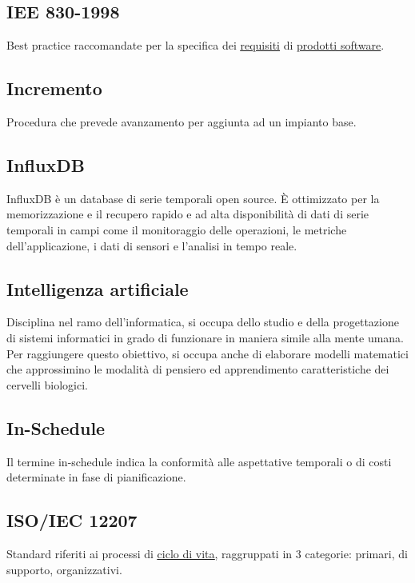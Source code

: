 	\newpage


	\subsection{IEE 830-1998}
	\label{sec:iee830}
	Best practice raccomandate per la specifica dei \underline{\hyperref[sec:requisito]{requisiti}} di \underline{\hyperref[sec:prodottosoftware]{prodotti software}}.


	\subsection{Incremento}
	\label{sec:incremento}
	Procedura che prevede avanzamento per aggiunta ad un impianto base.


	\subsection{InfluxDB}
	\label{sec:influxdb}
	InfluxDB è un database di serie temporali open source. È ottimizzato per la memorizzazione e il recupero rapido e ad alta disponibilità di dati di serie temporali in campi come il monitoraggio delle operazioni, le metriche dell'applicazione, i dati di sensori e l'analisi in tempo reale.


	\subsection{Intelligenza artificiale}
	\label{sec:ia}
	Disciplina nel ramo dell'informatica, si occupa dello studio e della progettazione di sistemi informatici in grado di funzionare in maniera simile alla mente umana. Per raggiungere questo obiettivo, si occupa anche di elaborare modelli matematici che approssimino le modalità di pensiero ed apprendimento caratteristiche dei cervelli biologici.


	\subsection{In-Schedule}
	\label{sec:inschedule}
	Il termine in-schedule indica la conformità alle aspettative temporali o di costi determinate in fase di pianificazione.


	\subsection{ISO/IEC 12207}
	\label{sec:iso12207}
	Standard riferiti ai processi di \underline{\hyperref[sec:ciclodivita]{ciclo di vita}}, raggruppati in 3 categorie: primari, di supporto, organizzativi.


